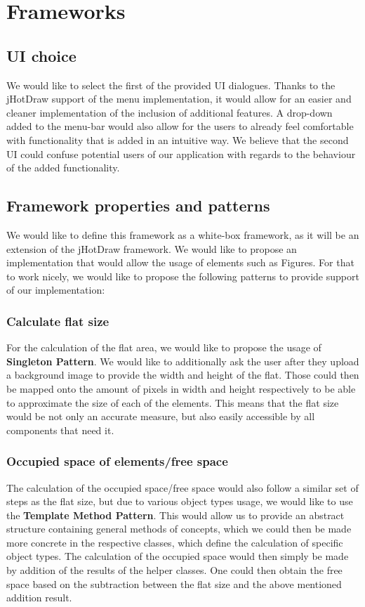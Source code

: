 
\section{Frameworks}



\subsection{UI choice}

We would like to select the first of the provided UI dialogues. Thanks to the jHotDraw support of the menu implementation, it would allow for an easier and cleaner implementation of the inclusion of additional features. A drop-down added to the menu-bar would also allow for the users to already feel comfortable with functionality that is added in an intuitive way. We believe that the second UI could confuse potential users of our application with regards to the behaviour of the added functionality.

\subsection{Framework properties and patterns}
We would like to define this framework as a white-box framework, as it will be an extension of the jHotDraw framework. We would like to propose an implementation that would allow the usage of elements such as Figures. For that to work nicely, we would like to propose the following patterns to provide support of our implementation:

\subsubsection{Calculate flat size}
For the calculation of the flat area, we would like to propose the usage of \textbf{Singleton Pattern}. We would like to additionally ask the user after they upload a background image to provide the width and height of the flat. Those could then be mapped onto the amount of pixels in width and height respectively to be able to approximate the size of each of the elements. This means that the flat size would be not only an accurate measure, but also easily accessible by all components that need it.

\subsubsection{Occupied space of elements/free space}
The calculation of the occupied space/free space would also follow a similar set of steps as the flat size, but due to various object types usage, we would like to use the \textbf{Template Method Pattern}. This would allow us to provide an abstract structure containing general methods of concepts, which we could then be made more concrete in the respective classes, which define the calculation of specific object types. The calculation of the occupied space would then simply be made by addition of the results of the helper classes. One could then obtain the free space based on the subtraction between the flat size and the above mentioned addition result.

